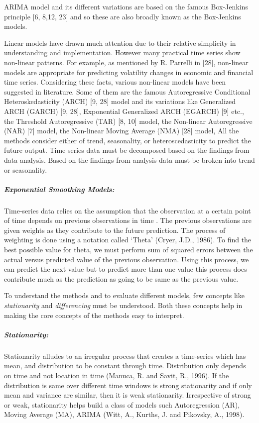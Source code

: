 \documentclass[
  letterpaper,
  DIV=11,
  numbers=noendperiod]{scrartcl}
\let\oldsubparagraph\subparagraph
\renewcommand{\subparagraph}[1]{\oldsubparagraph{#1}\mbox{}}
\begin{document}
ARIMA model and its different variations are based on the famous
Box-Jenkins principle {[}6, 8,12, 23{]} and so these are also broadly
known as the Box-Jenkins models.

Linear models have drawn much attention due to their relative simplicity
in understanding and implementation. However many practical time series
show non-linear patterns. For example, as mentioned by R. Parrelli in
{[}28{]}, non-linear models are appropriate for predicting volatility
changes in economic and financial time series. Considering these facts,
various non-linear models have been suggested in literature. Some of
them are the famous Autoregressive Conditional Heteroskedasticity (ARCH)
{[}9, 28{]} model and its variations like Generalized ARCH (GARCH) {[}9,
28{]}, Exponential Generalized ARCH (EGARCH) {[}9{]} etc., the Threshold
Autoregressive (TAR) {[}8, 10{]} model, the Non-linear Autoregressive
(NAR) {[}7{]} model, the Non-linear Moving Average (NMA) {[}28{]} model,
All the methods consider either of trend, seasonality, or
heteroscedasticity to predict the future output. Time series data must
be decomposed based on the findings from data analysis. Based on the
findings from analysis data must be broken into trend or seasonality.

\hypertarget{exponential-smoothing-models}{%
\subparagraph{Exponential Smoothing
Models:}\label{exponential-smoothing-models}}

Time-series data relies on the assumption that the observation at a
certain point of time depends on previous observations in time . The
previous observations are given weights as they contribute to the future
prediction. The process of weighting is done using a notation called
`Theta' (Cryer, J.D., 1986). To find the best possible value for theta,
we must perform sum of squared errors between the actual versus
predicted value of the previous observation. Using this process, we can
predict the next value but to predict more than one value this process
does contribute much as the prediction as going to be same as the
previous value.

To understand the methods and to evaluate different models, few concepts
like \emph{stationarity} and \emph{differencing} must be understood.
Both these concepts help in making the core concepts of the methods easy
to interpret.

\hypertarget{stationarity}{%
\subparagraph{\texorpdfstring{\textbf{Stationarity:}}{Stationarity:}}\label{stationarity}}

Stationarity alludes to an irregular process that creates a time-series
which has mean, and distribution to be constant through time.
Distribution only depends on time and not location in time (Manuca, R.
and Savit, R., 1996). If the distribution is same over different time
windows is strong stationarity and if only mean and variance are
similar, then it is weak stationarity. Irrespective of strong or weak,
stationarity helps build a class of models such Autoregression (AR),
Moving Average (MA), ARIMA (Witt, A., Kurths, J. and Pikovsky, A.,
1998).
\end{document}
